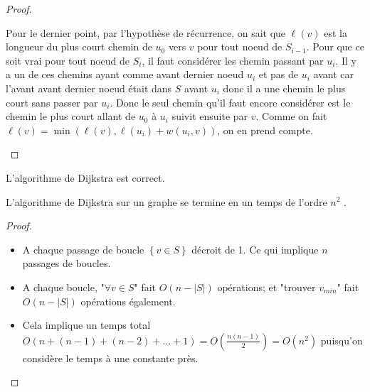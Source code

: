 \begin{mytheo} 
\begin{proof}
\begin{description}
\begin{itemize}
            Pour le dernier point,
            par l'hypothèse de récurrence, on sait que $\ell(v)$ est la longueur du plus court
            chemin de $u_0$ vers $v$ pour tout noeud de $S_{i-1}$.
            Pour que ce soit vrai pour tout noeud de $S_i$, il faut considérer les chemin passant
            par $u_i$.
            Il y a un de ces chemins ayant comme avant dernier noeud $u_i$ et pas de $u_i$ avant
            car l'avant avant dernier noeud était dans $S$ avant $u_i$ donc il a une chemin
            le plus court sans passer par $u_i$.
            Donc le seul chemin qu'il faut encore considérer est le chemin le plus court
            allant de $u_0$ à $u_i$ suivit ensuite par $v$.
            Comme on fait $\ell(v) = \min(\ell(v), \ell(u_i) + w(u_i, v))$, on en prend compte.
        \end{itemize}
    \end{description}
  \end{proof}
\end{mytheo}

\begin{mycorr} 
  L’algorithme de Dijkstra est correct.
\end{mycorr}

\begin{mytheo} 
  L’algorithme de Dijkstra sur un graphe se termine en un temps de l’ordre $n^2$ .
  \begin{proof}
    \noindent
    \begin{itemize}
		\item A chaque passage de boucle $\left\lbrace v \in S \right\rbrace $ décroit de 1. Ce qui implique $n$ passages de boucles.
		\item A chaque boucle, "$\forall v \in S$" fait $O(n-|S|)$ opérations; et "trouver $v_{min}$" fait $O(n-|S|)$ opérations également.
		\item Cela implique un temps total $O(n + (n-1) + (n-2) + ... + 1) = O\left( \frac{n(n-1)}{2} \right) = O(n^2)$ puisqu'on considère le temps à une constante près.
		\end{itemize}
  \end{proof}
\end{mytheo}

